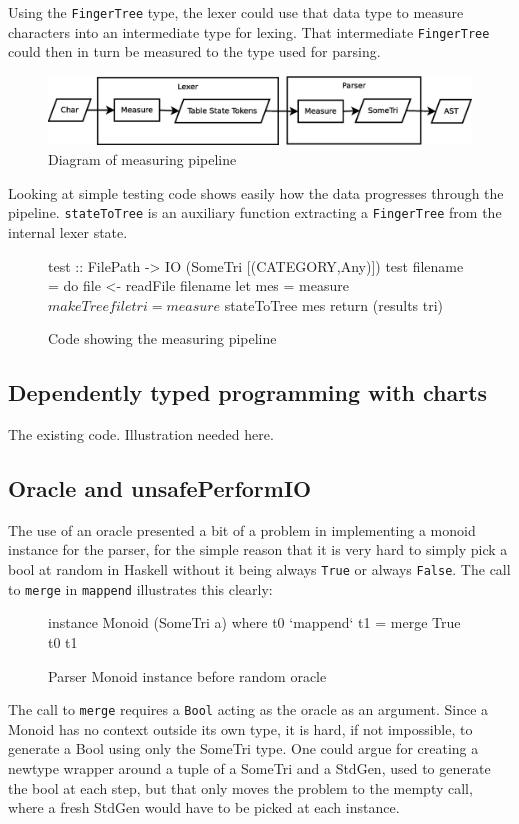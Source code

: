 \documentclass[a4paper,12pt,twosided]{report}
\begin{document}
Using the \texttt{FingerTree} type, the lexer could use that data type to
measure characters into an intermediate type for lexing. That intermediate
\texttt{FingerTree} could then in turn be measured to the type used for parsing.
\begin{figure}[H]
\includegraphics[width=\textwidth]{pipeline.eps}
\caption{Diagram of measuring pipeline}
\end{figure}
Looking at simple testing code shows easily how the data progresses through the
pipeline. \texttt{stateToTree} is an auxiliary function extracting a
\texttt{FingerTree} from the internal lexer state.

\begin{figure}[H]
\begin{code}
test :: FilePath -> IO (SomeTri [(CATEGORY,Any)])
test filename = do
    file <- readFile filename
    let mes = measure $ makeTree file
        tri = measure $ stateToTree mes
    return (results tri)
\end{code} 
\caption{Code showing the measuring pipeline}
\end{figure}

\subsection{Dependently typed programming with charts}
The existing code. Illustration needed here.

\subsection{Oracle and unsafePerformIO}
The use of an oracle presented a bit of a problem in implementing a monoid
instance for the parser, for the simple reason that it is very hard to simply
pick a bool at random in Haskell without it being always \texttt{True} or always
\texttt{False}. The call to \texttt{merge} in \texttt{mappend} illustrates this
clearly:
\begin{figure}[H]
\begin{code}
instance Monoid (SomeTri a) where
    t0 `mappend` t1 = merge True t0 t1
\end{code}
\caption{Parser Monoid instance before random oracle}
\end{figure}
The call to \texttt{merge} requires a \texttt{Bool} acting as the oracle as an
argument. Since a Monoid has no context outside its own type, it is hard, if not
impossible, to generate a Bool using only the SomeTri type. One could argue for
creating a newtype wrapper around a tuple of a SomeTri and a StdGen, used to
generate the bool at each step, but that only moves the problem to the mempty
call, where a fresh StdGen would have to be picked at each instance.
\end{document}
